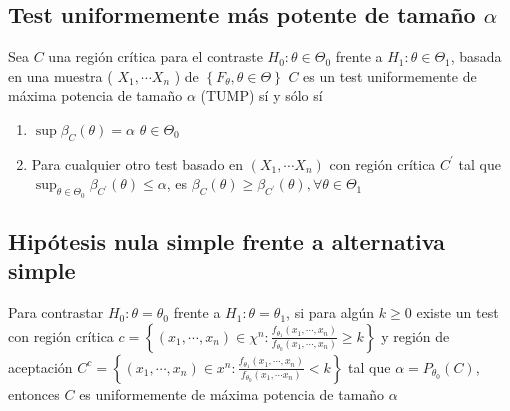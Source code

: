\subsection{Test uniformemente más potente de tamaño $\alpha$}


\begin{proposición}
Sea $C$ una región crítica para el contraste $H_{0}: \theta \in \Theta_{0}$ frente a $H_{1}: \theta \in \Theta_{1}$, basada en una muestra ( $X_{1}, \cdots X_{n}$ ) de $\left\{F_{\theta}, \theta \in \Theta\right\}$ $C$ es un test uniformemente de máxima potencia de tamaño $\alpha$ (TUMP) sí y sólo sí
\begin{enumerate}
\item $\sup \beta_{C}(\theta)=\alpha$ $\theta \in \Theta_{0}$
\item Para cualquier otro test basado en $\left(X_{1}, \cdots X_{n}\right)$ con región crítica $C^{\prime}$ tal que $\sup _{\theta \in \Theta_{0}} \beta_{C^{\prime}}(\theta) \leq \alpha$, es $\beta_{C}(\theta) \geq \beta_{C^{\prime}}(\theta), \forall \theta \in \Theta_{1}$
\end{enumerate}
\end{proposición}

\subsection{Hipótesis nula simple frente a alternativa simple}

\begin{teorema}  
Para contrastar $H_{0}: \theta=\theta_{0}$ frente a $H_{1}: \theta=\theta_{1}$, si para algún $k \geq 0$ existe un test con región crítica $c=\left\{\left(x_{1}, \cdots, x_{n}\right) \in \chi^{n}: \frac{f_{\theta_{1}}\left(x_{1}, \cdots, x_{n}\right)}{f_{\theta_0}\left(x_{1}, \cdots, x_{n}\right)} \geq k\right\}$ y región de aceptación $C^{c}=\left\{\left(x_{1}, \cdots, x_{n}\right) \in x^{n}: \frac{f_{\theta_{1}}\left(x_{1}, \cdots, x_{n}\right)}{f_{\theta_{0}}\left(x_{1}, \cdots x_{n}\right)}<k\right\}$ tal que $\alpha=P_{\theta_{0}}(C)$, entonces $C$ es uniformemente de máxima potencia de tamaño $\alpha$
\end{teorema}

